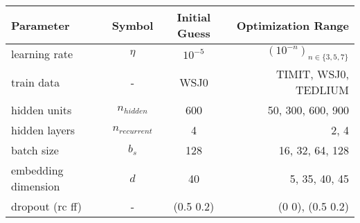 \documentclass[convert={outext=.svg,command=\unexpanded{pdf2svg \infile\space\outfile}},multi=false,border={1cm 1cm 1cm 1cm}]{standalone}
\begin{document}
    \begin{tabularx}{1.03\textwidth}{lccr}
        Parameter & Symbol & Initial Guess & Optimization Range    \tabularnewline
        \midrule
        learning rate & $\eta$          & $10^{-5}$     & $(10^{-n})_{n \in \{3,5,7\}}$  \tabularnewline
        \midrule
        train data & - & WSJ0 & TIMIT, WSJ0, TEDLIUM \tabularnewline
        \midrule
        hidden units & $n_{hidden}$    & 600 & 50, 300, 600, 900 \tabularnewline
        \midrule
        hidden layers & $n_{recurrent}$ & 4 & 2, 4 \tabularnewline
        \midrule
        batch size & $b_s$           & 128 & 16, 32, 64, 128  \tabularnewline
        \midrule
        embedding dimension & $d$             & 40 & 5, 35, 40, 45 \tabularnewline
        \midrule
        dropout (rc ff) & - & (0.5 0.2)     & (0 0), (0.5 0.2) \tabularnewline
        \midrule
    \end{tabularx}
\end{document}
